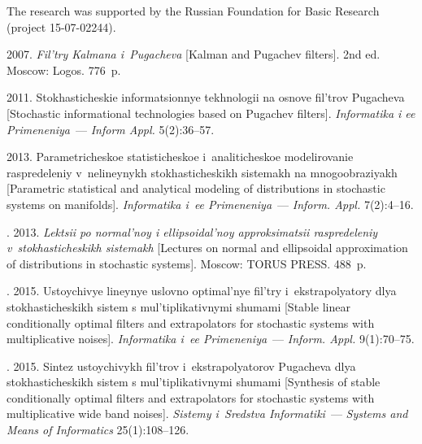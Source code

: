 
\Ack
\noindent
The research was supported by the Russian Foundation for Basic Research (project 15-07-02244).



\vspace*{3pt}

  \begin{multicols}{2}

\renewcommand{\bibname}{\protect\rmfamily References}



{\small\frenchspacing
 {%
 \begin{thebibliography}{9}

 2007. \textit{Fil'try Kalmana i~Pugacheva} [Kalman and Pugachev filters]. 2nd ed. Moscow: Logos.  776~p.


 2011. Stokhasticheskie informatsionnye tekhnologii na osnove fil'trov Pugacheva [Stochastic informational technologies based on Pugachev filters]. \textit{Informatika i ee Primeneniya}~---
\textit{Inform Appl.}   5(2):36--57.

  2013.
Parametricheskoe statisticheskoe i~analiticheskoe modelirovanie raspredeleniy
v~nelineynykh stokhasticheskikh sistemakh na mnogoobraziyakh
[Parametric statistical and analytical modeling of distributions in stochastic systems on manifolds].
\textit{Informatika i~ee Primeneniya}~---
\textit{Inform. Appl.} 7(2):4--16.

.  2013.
\textit{Lektsii po normal'noy i ellipsoidal'noy approksimatsii raspredeleniy
v~stokhasticheskikh sistemakh} [Lectures on normal and ellipsoidal
approximation of distributions in stochastic systems]. Moscow: TORUS PRESS. 488~p.

. 2015.
Ustoychivye lineynye uslovno optimal'nye fil'try i~ekstrapolyatory dlya stokhasticheskikh sistem s mul'tiplikativnymi shumami [Stable linear conditionally optimal filters and extrapolators for stochastic systems with multiplicative noises]. \textit{Informatika i~ee Primeneniya}~---
 \textit{Inform. Appl.}  9(1):70--75.


 . 2015.
Sintez ustoychivykh fil'trov i~ekstrapolyatorov Pugacheva dlya sto\-kha\-sti\-che\-skikh sistem s mul'tiplikativnymi shumami [Synthesis of stable conditionally optimal filters and extrapolators for stochastic systems with multiplicative wide band noises]. \textit{Sistemy i~Sredstva Informatiki}~---
\textit{Systems and Means of Informatics}  25(1):108--126.




\end{thebibliography}}}
\end{multicols}
